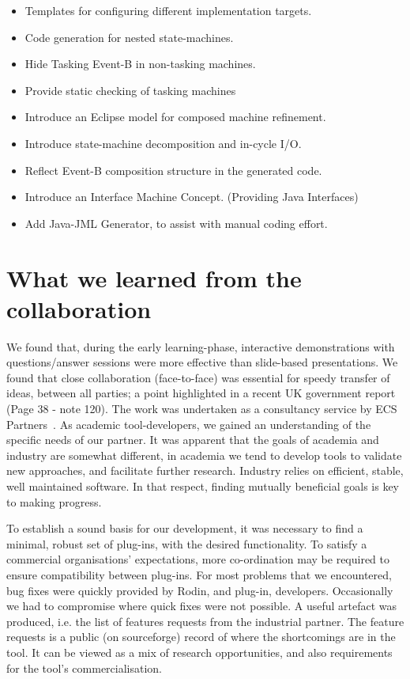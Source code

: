 \documentclass{llncs}%
\begin{document}
\begin{itemize}[noitemsep]
\item Templates for configuring different implementation targets.
\item Code generation for nested state-machines.
\item Hide Tasking Event-B in non-tasking machines.
\item Provide static checking of tasking machines
\item Introduce an Eclipse model for composed machine refinement.
\item Introduce state-machine decomposition and in-cycle I/O.
\item Reflect Event-B composition structure in the generated code.
\item Introduce an Interface Machine Concept. (Providing Java Interfaces)
\item Add Java-JML Generator, to assist with manual coding effort.
\end{itemize}
%
\section{What we learned from the collaboration}\label{Learning}
We found that, during the early learning-phase, interactive demonstrations with questions/answer sessions were more effective than slide-based presentations. We found that close collaboration (face-to-face) was essential for speedy transfer of ideas, between all parties; a point highlighted in a recent UK government report~\cite{CommonsSTC2013} (Page 38 - note 120). The work was undertaken as a consultancy service by ECS Partners~\cite{ecspartners}. As academic tool-developers, we gained an understanding of the specific needs of our partner. It was apparent that the goals of academia and industry are somewhat different, in academia we tend to develop tools to validate new approaches, and facilitate further research. Industry relies on efficient, stable, well maintained software. In that respect, finding mutually beneficial goals is key to making progress. 
 
To establish a sound basis for our development, it was necessary to find a minimal, robust set of plug-ins, with the desired functionality. To satisfy a commercial organisations' expectations, more co-ordination may be required to ensure compatibility between plug-ins. For most problems that we encountered, bug fixes were quickly provided by Rodin, and plug-in, developers. Occasionally we had to compromise where quick fixes were not  possible. A useful artefact was produced, i.e. the list of features requests from the industrial partner. The feature requests is a public (on sourceforge) record of where the shortcomings are in the tool. It can be viewed as a mix of research opportunities, and also requirements for the tool's commercialisation. 
\end{document}
